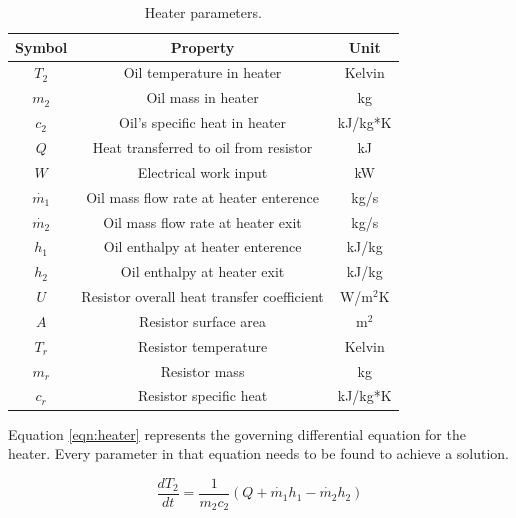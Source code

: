 \begin{table}[h]
    \centering
    \caption{Heater parameters.}
    \label{tab:heater}
    \begin{tabular}{|c|c|c|}
        \hline
        \textbf{Symbol} & \textbf{Property}                         & \textbf{Unit} \\
        \hline
        $T_{2}$         & Oil temperature in heater                 & Kelvin \\
        $m_{2}$         & Oil mass in heater                        & kg \\
        $c_{2}$         & Oil's specific heat in heater             & kJ/kg*K \\
        $Q$             & Heat transferred to oil from resistor     & kJ \\
        $W$             & Electrical work input                     & kW \\
        $\dot{m_{1}}$   & Oil mass flow rate at heater enterence    & kg/s \\
        $\dot{m_{2}}$   & Oil mass flow rate at heater exit         & kg/s \\
        $h_{1}$         & Oil enthalpy at heater enterence          & kJ/kg \\
        $h_{2}$         & Oil enthalpy at heater exit               & kJ/kg \\
        $U$             & Resistor overall heat transfer coefficient & W/m$^2$K \\
        $A$             & Resistor surface area                     & m$^2$ \\
        $T_{r}$         & Resistor temperature                      & Kelvin \\
        $m_{r}$         & Resistor mass                             & kg \\
        $c_{r}$         & Resistor specific heat                    & kJ/kg*K \\
        \hline
    \end{tabular}
\end{table}

\par
Equation \ref*{eqn:heater} represents the governing differential equation for the heater. Every parameter in that equation needs to be found to achieve a solution. 

\begin{equation}
    \label{eqn:heater}
    \frac{dT_{2}}{dt} = \frac{1}{m_{2}c_{2}}(Q + \dot{m_{1}}h_{1} - \dot{m_{2}}h_{2})
\end{equation}

